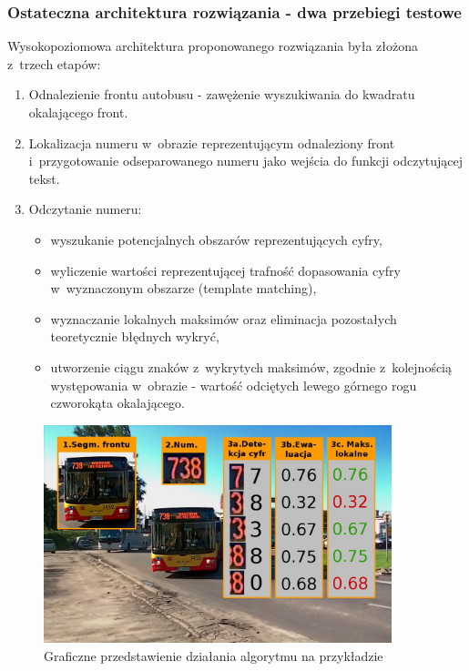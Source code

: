\subsubsection{Ostateczna architektura rozwiązania 
- dwa przebiegi testowe}

Wysokopoziomowa architektura proponowanego rozwiązania była złożona 
z~trzech etapów:
\begin{enumerate}
    \item Odnalezienie frontu autobusu - zawężenie wyszukiwania 
        do kwadratu okalającego front.
    \item Lokalizacja numeru w~obrazie reprezentującym odnaleziony
        front i~przygotowanie odseparowanego numeru jako wejścia
        do funkcji odczytującej tekst.
    \item Odczytanie numeru:
        \begin{itemize}
            \item wyszukanie potencjalnych obszarów reprezentujących
                cyfry,
            \item wyliczenie wartości reprezentującej trafność
                dopasowania cyfry w~wyznaczonym obszarze (template
                matching),
            \item wyznaczanie lokalnych maksimów oraz eliminacja 
                pozostałych teoretycznie błędnych wykryć,
            \item utworzenie ciągu znaków z~wykrytych maksimów,
                zgodnie z~kolejnością występowania w~obrazie -
                wartość odciętych lewego górnego rogu czworokąta
                okalającego.
        \end{itemize}
\end{enumerate}

\begin{figure}[!h]
    \centering
    \includegraphics[width=0.9\textwidth]{img/exp_alg_explanation}
    \caption{Graficzne przedstawienie działania algorytmu na przykładzie}
    \label{fig:algexp}
\end{figure}

